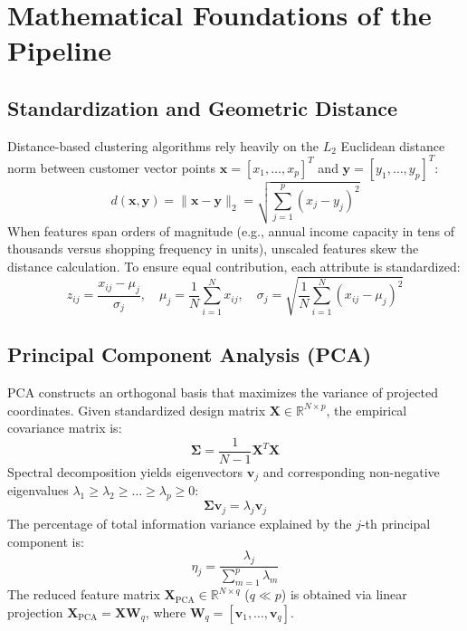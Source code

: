 \documentclass[11pt,a4paper]{article}
\begin{document}
\section{Mathematical Foundations of the Pipeline}

\subsection{Standardization and Geometric Distance}
Distance-based clustering algorithms rely heavily on the $L_2$ Euclidean distance norm between customer vector points $\mathbf{x} = [x_1, \dots, x_p]^T$ and $\mathbf{y} = [y_1, \dots, y_p]^T$:
\begin{equation}
    d(\mathbf{x}, \mathbf{y}) = \|\mathbf{x} - \mathbf{y}\|_2 = \sqrt{\sum_{j=1}^p (x_j - y_j)^2}
\end{equation}
When features span orders of magnitude (e.g., annual income capacity in tens of thousands versus shopping frequency in units), unscaled features skew the distance calculation. To ensure equal contribution, each attribute is standardized:
\begin{equation}
    z_{ij} = \frac{x_{ij} - \mu_j}{\sigma_j}, \quad \mu_j = \frac{1}{N}\sum_{i=1}^N x_{ij}, \quad \sigma_j = \sqrt{\frac{1}{N}\sum_{i=1}^N (x_{ij} - \mu_j)^2}
\end{equation}

\subsection{Principal Component Analysis (PCA)}
PCA constructs an orthogonal basis that maximizes the variance of projected coordinates. Given standardized design matrix $\mathbf{X} \in \mathbb{R}^{N \times p}$, the empirical covariance matrix is:
\begin{equation}
    \mathbf{\Sigma} = \frac{1}{N-1} \mathbf{X}^T \mathbf{X}
\end{equation}
Spectral decomposition yields eigenvectors $\mathbf{v}_j$ and corresponding non-negative eigenvalues $\lambda_1 \ge \lambda_2 \ge \dots \ge \lambda_p \ge 0$:
\begin{equation}
    \mathbf{\Sigma} \mathbf{v}_j = \lambda_j \mathbf{v}_j
\end{equation}
The percentage of total information variance explained by the $j$-th principal component is:
\begin{equation}
    \eta_j = \frac{\lambda_j}{\sum_{m=1}^p \lambda_m}
\end{equation}
The reduced feature matrix $\mathbf{X}_{\text{PCA}} \in \mathbb{R}^{N \times q}$ ($q \ll p$) is obtained via linear projection $\mathbf{X}_{\text{PCA}} = \mathbf{X} \mathbf{W}_q$, where $\mathbf{W}_q = [\mathbf{v}_1, \dots, \mathbf{v}_q]$.
\end{document}
